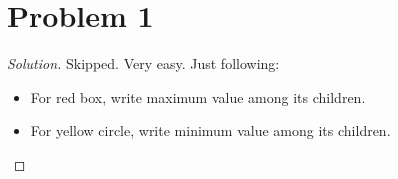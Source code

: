 \section*{Problem 1}
	\begin{proof} [Solution]
		Skipped. Very easy. Just following:
		\begin{itemize}
			\item For red box, write maximum value among its children.
			\item For yellow circle, write minimum value among its children.
		\end{itemize}
	\end{proof}
	